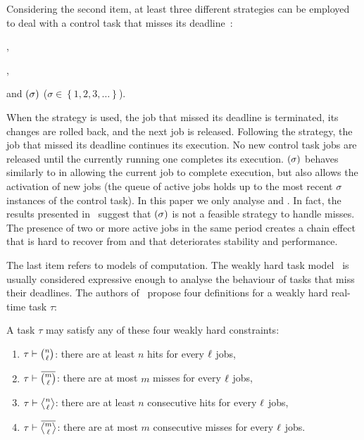Considering the second item, at least three different strategies can be employed to deal with a control task that misses its deadline~\cite{Cervin:2005}:
\begin{enumerate*}[label=(\roman*)]
    \item \emph{\tK{}},
    \item \emph{\tS{}},
    \item and \emph{\tQ{}$\left( \sigma \right)$} ($\sigma \in \left\{ 1, 2, 3, \ldots \right\}$).
\end{enumerate*}
%
When the \tK{} strategy is used, the job that missed its deadline is terminated, its changes are rolled back, and the next job is released.
Following the \tS{} strategy, the job that missed its deadline continues its execution.
No new control task jobs are released until the currently running one completes its execution.
\tQ{}$\left( \sigma \right)$ behaves similarly to \tS{} in allowing the current job to complete execution, but also allows the activation of new jobs (the queue of active jobs holds up to the most recent $\sigma$ instances of the control task).
In this paper we only analyse \tK{} and \tS{}.
In fact, the results presented in~\cite{Cervin:2005,Maggio:2020} suggest that \tQ{}$\left( \sigma \right)$ is not a feasible strategy to handle misses.
The presence of two or more active jobs in the same period creates a chain effect that is hard to recover from and that deteriorates stability and performance.

The last item refers to models of computation.
The weakly hard task model~\cite{Hamdaoui:1995, Bernat:2001} is usually considered expressive enough to analyse the behaviour of tasks that miss their deadlines.
The authors of~\cite{Bernat:2001} propose four definitions for a weakly hard real-time task $\tau$:
\begin{definition}%
    \label{def:wh-models}%
    A task $\tau$ may satisfy any of these four weakly hard constraints:
    \begin{enumerate}[label=(\roman*)]
        \item $\tau \vdash \binom{n}{\!\:\!\:\ell\!\:\!\:}$: there are at least $n$ hits for every $\ell$ jobs,
        \item $\tau \vdash \overbar{\binom{m}{\numtotalanalysed}}$: there are at most $m$ misses for every $\ell$ jobs, 
        \item $\tau \vdash \genfrac{<}{>}{0pt}{}{n}{\!\:\!\:\numtotalanalysed\!\:\!\:}$: there are at least $n$ consecutive hits for every $\ell$ jobs,
        \item $\tau \vdash \overbar{\genfrac{<}{>}{0pt}{}{m}{\numtotalanalysed}}$: there are at most $m$ consecutive misses for every $\ell$ jobs.
    \end{enumerate}
\end{definition}


